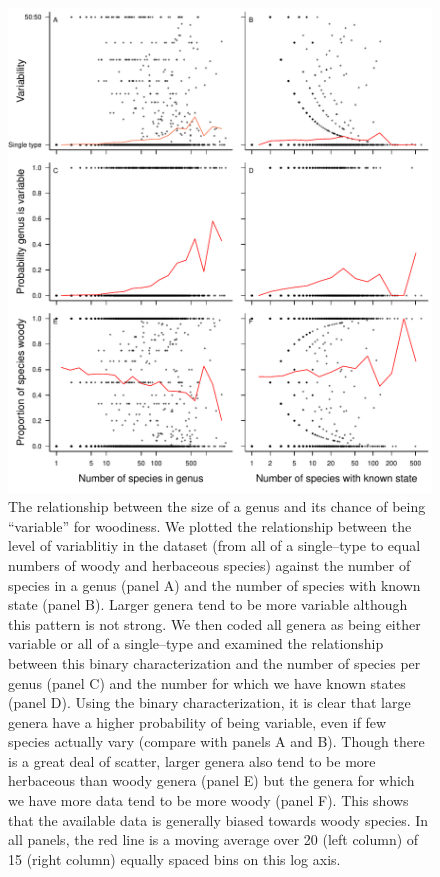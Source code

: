 \begin{figure}[p]
  \centering
  \includegraphics[width=.8\textwidth]{figs/variability}
  \caption[Relationship between genus size and proportion of
  woodiness]{The relationship between the size of a genus and its
    chance of being ``variable'' for woodiness.
%
We plotted the relationship between the level of variablitiy in the
dataset (from all of a single--type to equal numbers of woody and
herbaceous species) against the number of species in a genus (panel A)
and the number of species with known state (panel B). Larger genera
tend to be more variable although this pattern is not strong. We then
coded all genera as being either variable or all of a single--type and
examined the relationship between this binary characterization and the
number of species per genus (panel C) and the number for which we
have known states (panel D). Using the binary characterization, it is
clear that large genera have a higher probability of being variable,
even if few species actually vary (compare with panels A and
B). Though there is a great deal of scatter, larger genera also tend to be
more herbaceous than woody genera (panel E) but the genera for which
we have more data tend to be more woody (panel F). This shows that the
available data is generally biased towards woody species.  In all
panels, the red line is a moving average over 20 (left column) of 15 (right
column) equally spaced bins on this log axis.}
  \label{fig:variability}
\end{figure}

